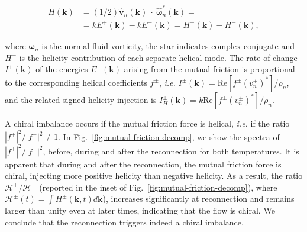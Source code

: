 \documentclass[%
 reprint,
 amsmath,amssymb,
 aps,
 prl,
]{revtex4-2}
\def \k{\mathbf{k}}
\begin{document}
\begin{equation}
\begin{split}
H(\k) & = (1/2) \hat{\mathbf{v}}_n (\k)\!\!\! ~\cdot~\!\!\! \hat{\bm{\omega}}_n^* (\k) = \\
& = k E^+(\k) - k E^-(\k)  = H^+(\k) - H^-(\k),
\end{split}
\end{equation}

\noindent 
where $\bm{\omega}_n$ is the normal fluid vorticity, the star indicates 
complex conjugate and $H^\pm$ is the helicity contribution of each 
separate helical mode. 
The rate of change $I^\pm(\k)$ of the energies $E^{\pm}(\k)$ arising from the mutual 
friction is proportional to the corresponding helical coefficients
$f^\pm$, \textit{i.e.} $I^\pm(\k) = \mathrm{Re} [f^\pm (v_n^\pm)^*] /\rho_n$, 
and the related signed helicity injection is 
$I_H^\pm(\k) = k \mathrm{Re} [f^\pm (v_n^\pm)^*] /\rho_n$. 

A chiral imbalance occurs if the mutual friction force is helical, 
\textit{i.e.} if the ratio $|f^+|^2/|f^-|^2 \neq 1$. 
In Fig.~\ref{fig:mutual-friction-decomp}, we show the spectra of $|f^+|^2/|f^-|^2$, 
before, during and after the reconnection for both temperatures. It is apparent
that during and after the reconnection, the mutual friction force is chiral,
injecting more positive helicity than negative helicity. 
As a result, the ratio $\mathcal{H}^+/\mathcal{H}^-$ 
(reported in the inset of Fig.~\ref{fig:mutual-friction-decomp}), 
where $\mathcal{H}^\pm (t) = \int\!\!H^\pm(\k,t)d\k$), 
increases significantly at reconnection and remains larger than unity even at later times, 
indicating that the flow is chiral. We conclude that the reconnection triggers indeed
a chiral imbalance.


  
\end{document}
